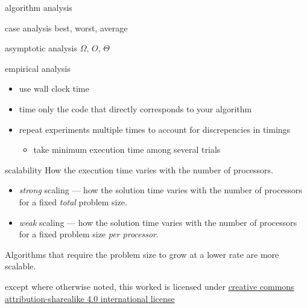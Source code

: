 \documentclass[10pt, t]{beamer}
\begin{document}

  \begin{frame}{algorithm analysis}
    \begin{block}{case analysis}
      best, worst, average
    \end{block}

    \begin{block}{asymptotic analysis}
      $\Omega$, $O$, $\Theta$
    \end{block}
  \end{frame}

  \begin{frame}{empirical analysis}
    \begin{itemize}
      \item use wall clock time
      \item time only the code that directly corresponds to your algorithm
      \item repeat experiments multiple times to account for discrepencies in
        timings
        \begin{itemize}
          \item take minimum execution time among several trials
        \end{itemize}
    \end{itemize}

  \end{frame}

  \begin{frame}{scalability}
    How the execution time varies with the number of processors.
    \begin{itemize}
      \item \emph{strong} scaling --- how the solution time varies with the
        number of processors for a fixed \emph{total} problem size.
      \item \emph{weak} scaling --- how the solution time varies with the
        number of processors for a fixed problem size \emph{per processor}.
    \end{itemize}

    \pause

    Algorithms that require the problem size to grow at a lower rate are more
    scalable.
  \end{frame}

  \appendix

  \begin{frame}[c]
    \begin{center}\ccbysa\end{center}

    except where otherwise noted, this worked is licensed under
    \href{http://creativecommons.org/licenses/by-sa/4.0/}{creative commons
    attribution-sharealike 4.0 international license}
  \end{frame}
\end{document}
